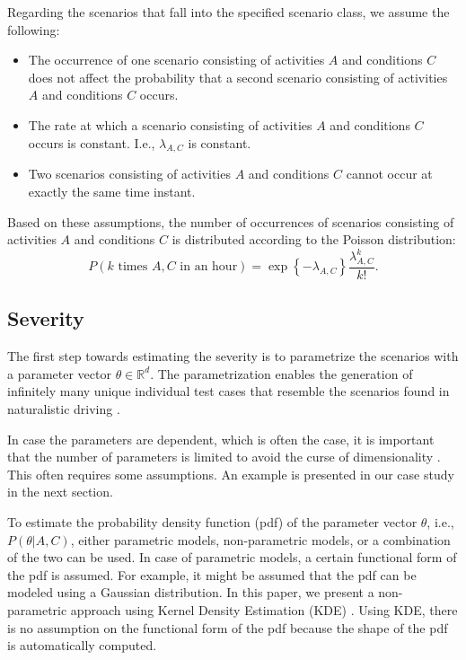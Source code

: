 Regarding the scenarios that fall into the specified scenario class, we assume the following:
\begin{itemize}
	\item The occurrence of one scenario consisting of activities $A$ and conditions $C$ does not affect the probability that a second scenario consisting of activities $A$ and conditions $C$ occurs.
	\item The rate at which a scenario consisting of activities $A$ and conditions $C$ occurs is constant. I.e., $\lambda_{A,C}$ is constant.
	\item Two scenarios consisting of activities $A$ and conditions $C$ cannot occur at exactly the same time instant.
\end{itemize}
Based on these assumptions, the number of occurrences of scenarios consisting of activities $A$ and conditions $C$ is distributed according to the Poisson distribution:
\begin{equation}
	P(k\text{ times }A,C\text{ in an hour}) = \exp \left\{-\lambda_{A,C} \right\} \frac{\lambda_{A,C}^k}{k!}.
\end{equation}



\subsection{Severity}

The first step towards estimating the severity is to parametrize the scenarios with a parameter vector $\theta \in \mathbb{R}^d$. The parametrization enables the generation of infinitely many unique individual test cases that resemble the scenarios found in naturalistic driving \cite{deGelder2017assessment,elrofai2018scenario}.

In case the parameters are dependent, which is often the case, it is important that the number of parameters is limited to avoid the curse of dimensionality \cite{scott2015multivariate}. This often requires some assumptions. An example is presented in our case study in the next section.

To estimate the probability density function (pdf) of the parameter vector $\theta$, i.e., $P(\theta|A,C)$, either parametric models, non-parametric models, or a combination of the two can be used. In case of parametric models, a certain functional form of the pdf is assumed. For example, it might be assumed that the pdf can be modeled using a Gaussian distribution. In this paper, we present a non-parametric approach using Kernel Density Estimation (KDE) \cite{rosenblatt1956remarks, parzen1962estimation}. Using KDE, there is no assumption on the functional form of the pdf because the shape of the pdf is automatically computed.

